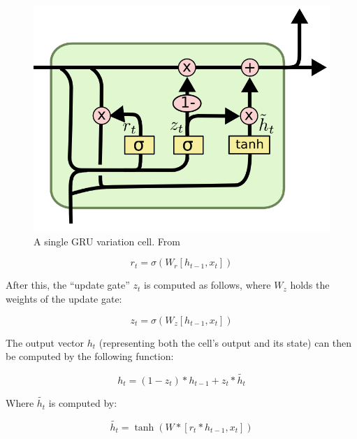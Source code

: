 \begin{figure}
	\begin{center}
		\includegraphics[scale=0.5]{rnn/gru_cell}
	\end{center}
	\caption{A single GRU variation cell. From~\cite{olah2015understanding}\label{fig:gru_cell}}
\end{figure}

\begin{equation} \label{eq:gru_reset_gate}
r_t = \sigma(W_r [h_{t-1}, x_t])
\end{equation}

After this, the \enquote{update gate} \(z_t\) is computed as follows, where \(W_z\) holds the weights of the update gate:

\begin{equation} \label{eq:gru_update_gate}
z_t = \sigma(W_z [h_{t-1}, x_t])
\end{equation}

The output vector \(h_t\) (representing both the cell's output and its state) can then be computed by the following function:

\begin{equation} \label{eq:gru_output}
h_t = (1 - z_t) * h_{t-1} + z_t * \tilde{h_t}
\end{equation}

Where \(\tilde{h_t}\) is computed by:

\begin{equation} \label{eq:gru_output_partial}
\tilde{h_t} = \tanh(W * [r_t * h_{t-1}, x_t])
\end{equation}

